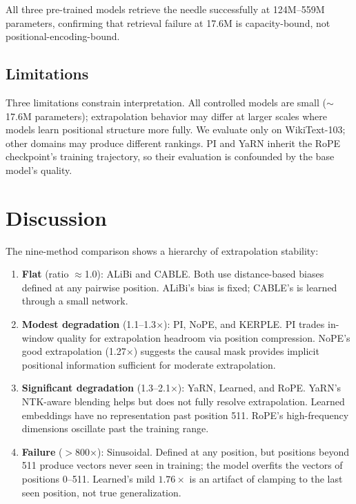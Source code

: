 \documentclass[conference]{IEEEtran}
\begin{document}
All three pre-trained models retrieve the needle successfully at 124M--559M parameters, confirming that retrieval failure at 17.6M is capacity-bound, not positional-encoding-bound.

\subsection{Limitations}

Three limitations constrain interpretation. All controlled models are small ($\sim$17.6M parameters); extrapolation behavior may differ at larger scales where models learn positional structure more fully. We evaluate only on WikiText-103; other domains may produce different rankings. PI and YaRN inherit the RoPE checkpoint's training trajectory, so their evaluation is confounded by the base model's quality.

\section{Discussion}

The nine-method comparison shows a hierarchy of extrapolation stability:

\begin{enumerate}
\item \textbf{Flat} (ratio $\approx$1.0): ALiBi and CABLE. Both use distance-based biases defined at any pairwise position. ALiBi's bias is fixed; CABLE's is learned through a small network.
\item \textbf{Modest degradation} (1.1--1.3$\times$): PI, NoPE, and KERPLE. PI trades in-window quality for extrapolation headroom via position compression. NoPE's good extrapolation (1.27$\times$) suggests the causal mask provides implicit positional information sufficient for moderate extrapolation.
\item \textbf{Significant degradation} (1.3--2.1$\times$): YaRN, Learned, and RoPE. YaRN's NTK-aware blending helps but does not fully resolve extrapolation. Learned embeddings have no representation past position 511. RoPE's high-frequency dimensions oscillate past the training range.
\item \textbf{Failure} ($>$800$\times$): Sinusoidal. Defined at any position, but positions beyond 511 produce vectors never seen in training; the model overfits the vectors of positions 0--511. Learned's mild $1.76\times$ is an artifact of clamping to the last seen position, not true generalization.
\end{enumerate}
\end{document}
